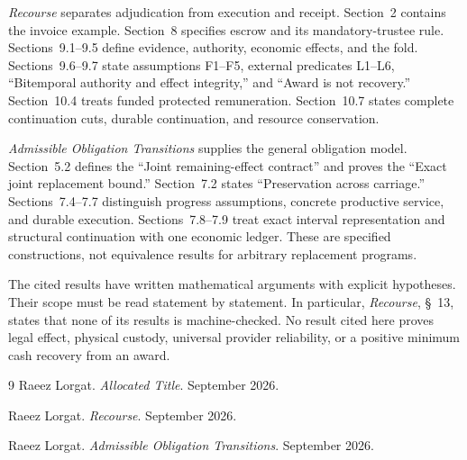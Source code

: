 \documentclass{momentum}
\begin{document}
\emph{Recourse} separates adjudication from execution and receipt. Section~2 contains the invoice example. Section~8 specifies escrow and its mandatory-trustee rule. Sections~9.1--9.5 define evidence, authority, economic effects, and the fold. Sections~9.6--9.7 state assumptions F1--F5, external predicates L1--L6, ``Bitemporal authority and effect integrity,'' and ``Award is not recovery.'' Section~10.4 treats funded protected remuneration. Section~10.7 states complete continuation cuts, durable continuation, and resource conservation.

\emph{Admissible Obligation Transitions} supplies the general obligation model. Section~5.2 defines the ``Joint remaining-effect contract'' and proves the ``Exact joint replacement bound.'' Section~7.2 states ``Preservation across carriage.'' Sections~7.4--7.7 distinguish progress assumptions, concrete productive service, and durable execution. Sections~7.8--7.9 treat exact interval representation and structural continuation with one economic ledger. These are specified constructions, not equivalence results for arbitrary replacement programs.

The cited results have written mathematical arguments with explicit hypotheses. Their scope must be read statement by statement. In particular, \emph{Recourse}, \S~13, states that none of its results is machine-checked. No result cited here proves legal effect, physical custody, universal provider reliability, or a positive minimum cash recovery from an award.

\begin{thebibliography}{9}
Raeez Lorgat. \emph{Allocated Title}. September 2026.

Raeez Lorgat. \emph{Recourse}. September 2026.

Raeez Lorgat. \emph{Admissible Obligation Transitions}. September 2026.
\end{thebibliography}
\end{document}
